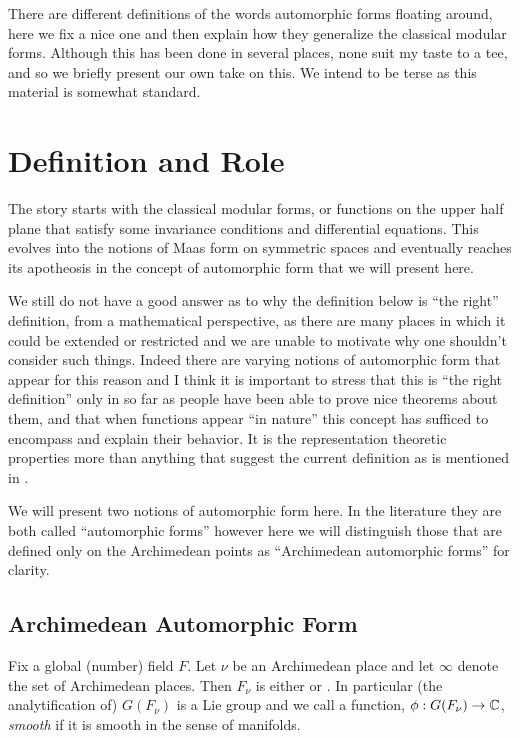 There are different definitions of the words automorphic forms floating around, here we fix a nice one and then explain how they generalize the classical modular forms. Although this has been done in several places, none suit my taste to a tee, and so we briefly present our own take on this. We intend to be terse as this material is somewhat standard.

\section{Definition and Role}
The story starts with the classical modular forms, or functions on the upper half plane that satisfy some invariance conditions and differential equations. This evolves into the notions of Maas form on symmetric spaces and eventually reaches its apotheosis in the concept of automorphic form that we will present here. 

We still do not have a good answer as to why the definition below is ``the right'' definition, from a mathematical perspective, as there are many places in which it could be extended or restricted and we are unable to motivate why one shouldn't consider such things. Indeed there are varying notions of automorphic form that appear for this reason and I think it is important to stress that this is ``the right definition'' only in so far as people have been able to prove nice theorems about them, and that when functions appear ``in nature'' this concept has sufficed to encompass and explain their behavior. It is the representation theoretic properties more than anything that suggest the current definition as is mentioned in \cite[1.II.3]{borelAutomorphicFormsRepresentations1979}.

We will present two notions of automorphic form here. In the literature they are both called ``automorphic forms'' however here we will distinguish those that are defined only on the Archimedean points as ``Archimedean automorphic forms'' for clarity.

\subsection{Archimedean Automorphic Form}
Fix a global (number) field \(F\). Let \(\nu\) be an Archimedean place and let \(\infty\) denote the set of Archimedean places. Then \(F_\nu\) is either \R or \C. In particular (the analytification of) \(G(F_\nu)\) is a Lie group and we call a function, \(\phi: G(F_\nu) \to \C\), \textit{smooth}  if it is smooth in the sense of manifolds.


